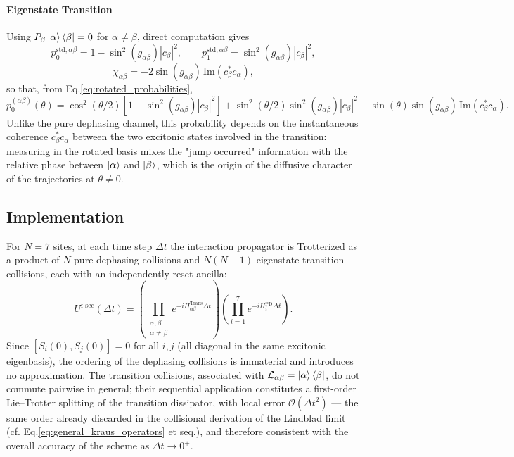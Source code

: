 \documentclass[a4paper,12pt]{article}
\begin{document}
\paragraph{Eigenstate Transition} Using $P_{\beta}\Ket{\alpha}\Bra{\beta}=0$ for $\alpha\neq\beta$, direct computation gives
\begin{equation}
	p_{0}^{\text{std},\alpha\beta} = 1-\sin^{2}(g_{\alpha\beta})|c_{\beta}|^{2}, \qquad
	p_{1}^{\text{std},\alpha\beta} = \sin^{2}(g_{\alpha\beta})|c_{\beta}|^{2},
\end{equation}
\begin{equation}
	\chi_{\alpha\beta} = -2\sin(g_{\alpha\beta})\,\text{Im}\!\left(c_{\beta}^{*}c_{\alpha}\right),
\end{equation}
so that, from Eq.\ref{eq:rotated_probabilities},
\begin{equation}
	p_{0}^{(\alpha\beta)}(\theta) = \cos^{2}(\theta/2)\left[1-\sin^{2}(g_{\alpha\beta})|c_{\beta}|^{2}\right] + \sin^{2}(\theta/2)\sin^{2}(g_{\alpha\beta})|c_{\beta}|^{2} - \sin(\theta)\sin(g_{\alpha\beta})\,\text{Im}\!\left(c_{\beta}^{*}c_{\alpha}\right).
	\label{eq:p0_transition_explicit}
\end{equation}
Unlike the pure dephasing channel, this probability depends on the instantaneous coherence $c_{\beta}^{*}c_{\alpha}$ between the two excitonic states involved in the transition: measuring in the rotated basis mixes the "jump occurred" information with the relative phase between $\Ket{\alpha}$ and $\Ket{\beta}$, which is the origin of the diffusive character of the trajectories at $\theta\neq0$.

\subsection{Implementation}
For $N=7$ sites, at each time step $\Delta t$ the interaction propagator is Trotterized as a product of 
$N$ pure-dephasing collisions and $N(N-1)$ eigenstate-transition collisions, each with an independently 
reset ancilla:
\begin{equation}
	U^{\text{f-sec}}(\Delta t) = \left(\prod_{\substack{\alpha,\beta \\ \alpha\neq\beta}} e^{-iH_{\alpha\beta}^{\text{Trans}}\Delta t}\right)\left(\prod_{i=1}^{7} e^{-iH_{i}^{\text{PD}}\Delta t}\right).
\end{equation}
Since $[S_i(0),S_j(0)]=0$ for all $i,j$ (all diagonal in the same excitonic eigenbasis), the ordering of the 
dephasing collisions is immaterial and introduces no approximation. The transition collisions, associated 
with $\mathcal{L}_{\alpha\beta}=\Ket{\alpha}\Bra{\beta}$, do not commute pairwise in general; their sequential 
application constitutes a first-order Lie–Trotter splitting of the transition dissipator, with local error 
$\mathcal{O}(\Delta t^{2})$ — the same order already discarded in the collisional derivation of the Lindblad 
limit (cf. Eq.\ref{eq:general_kraus_operators} et seq.), and therefore consistent with the overall accuracy 
of the scheme as $\Delta t \to 0^{+}$.
\end{document}
